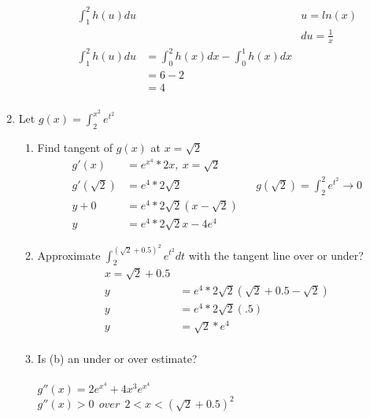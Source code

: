 \documentclass[11pt]{article}
\begin{document}
\begin{enumerate}
\begin{enumerate}
            \begin{align*}
                \label{eq:2d}
                \int_{1}^{2}h(u)du && u = ln(x) \\
                && du = \frac{1}{x} \\
                \int_{1}^{2}h(u)du &= \int_{0}^{2}h(x)dx - \int_{0}^{1}h(x)dx \\
                &= 6 - 2 \\
                &= 4
                \\
            \end{align*}
        \end{enumerate}
        \item Let $g(x) = \int_{2}^{x^2}e^{t^2}$ \label{q:3}
        \begin{enumerate}
            \item Find tangent of $g(x)$ at $x = \sqrt{2}$
            \begin{align*}
                \label{eq:3a}
                g'(x) &= e^{x^4}*2x,\ x=\sqrt{2} \\
                g'(\sqrt{2}) &= e^{4} * 2\sqrt{2} && g(\sqrt{2})=\int_{2}^{2}e^{t^2} \to 0 \\
                y + 0 &=  e^{4} * 2\sqrt{2}(x - \sqrt{2}) \\
                y &= e^4*2\sqrt{2}x - 4e^4
            \end{align*}
            \item Approximate $\int_{2}^{(\sqrt{2}+0.5)^2}e^{t^2}dt$ with the tangent line over or under? \label{q:3b}
            \begin{align*}
                \label{eq:3b}
                x = \sqrt{2} + 0.5 \\
                y &= e^4*2\sqrt{2}(\sqrt{2} + 0.5 - \sqrt{2}) \\
                y &= e^4*2\sqrt{2}(.5) \\
                y &= \sqrt{2}*e^4 \\
            \end{align*}
            \item Is (b) an under or over estimate? \label{q:3c} \\ \\
            $g''(x) = 2e^{x^4} + 4x^{3}e^{x^4}$ \\
            $g''(x) > 0\ \ over\ \ 2<x<(\sqrt{2}+0.5)^2$  \\ \therefore {}


\end{enumerate}
\end{enumerate}
\end{document}
